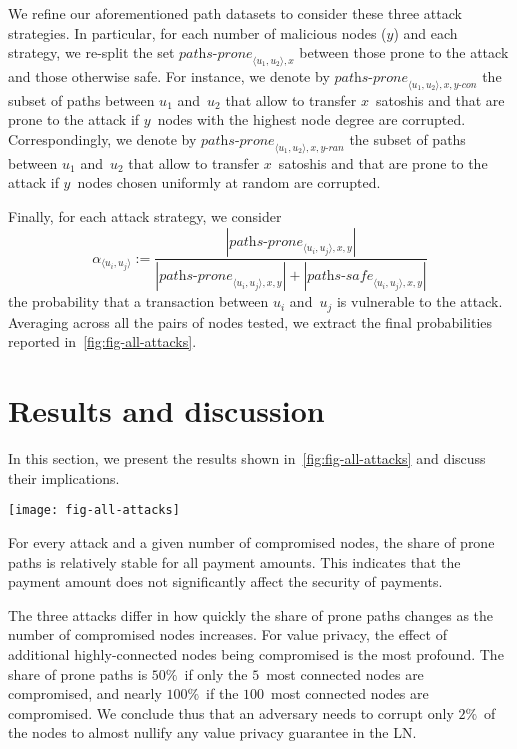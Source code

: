 We refine our aforementioned path datasets to consider these three attack strategies.
In particular, for each number of malicious nodes ($y$) and each strategy, we re-split the set $\textit{paths-prone}_{\langle u_1, u_2 \rangle, x}$ between those prone to the attack and those otherwise safe.
For instance, we denote by $\textit{paths-prone}_{\langle u_1, u_2 \rangle, x, y\textit{-con}}$ the subset of paths between $u_1$ and~$u_2$ that allow to transfer $x$~satoshis and that are prone to the attack if $y$~nodes with the highest node degree are corrupted.
Correspondingly, we denote by $\textit{paths-prone}_{\langle u_1, u_2 \rangle, x, y\textit{-ran}}$ the subset of paths between $u_1$ and~$u_2$ that allow to transfer $x$~satoshis and that are prone to the attack if $y$~nodes chosen uniformly at random are corrupted.

Finally, for each attack strategy, we consider $$\alpha_{\langle u_i, u_j \rangle} := \frac{|\textit{paths-prone}_{\langle u_i, u_j \rangle, x, y}|}{|\textit{paths-prone}_{\langle u_i, u_j \rangle, x, y}| + |\textit{paths-safe}_{\langle u_i, u_j \rangle, x, y}|}$$ the probability that a transaction between $u_i$ and~$u_j$ is vulnerable to the attack.
Averaging across all the pairs of nodes tested, we extract the final probabilities reported in~\cref{fig:fig-all-attacks}.

\section{Results and discussion}

In this section, we present the results shown in~\cref{fig:fig-all-attacks} and discuss their implications.
\begin{figure*}
	\centering
	\texttt{[image: fig-all-attacks]}
	\caption{Share of prone paths for each parameter combination.}
	\label{fig:fig-all-attacks}
\end{figure*}

For every attack and a given number of compromised nodes, the share of prone paths is relatively stable for all payment amounts.
This indicates that the payment amount does not significantly affect the security of payments.

The three attacks differ in how quickly the share of prone paths changes as the number of compromised nodes increases.
For value privacy, the effect of additional highly-connected nodes being compromised is the most profound.
The share of prone paths is $50\%$~if only the $5$~most connected nodes are compromised, and nearly $100\%$~if the $100$~most connected nodes are compromised.
We conclude thus that an adversary needs to corrupt only $2\%$~of the nodes to almost nullify any value privacy guarantee in the LN\@.

